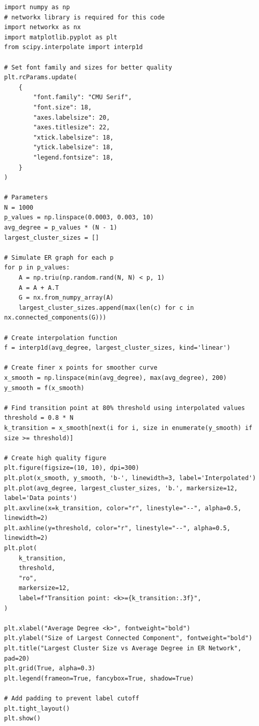 \documentclass{article}
\begin{document}
\begin{lstlisting}[caption=Erdős-Rényi Network Analysis]
import numpy as np
# networkx library is required for this code
import networkx as nx
import matplotlib.pyplot as plt
from scipy.interpolate import interp1d

# Set font family and sizes for better quality
plt.rcParams.update(
    {
        "font.family": "CMU Serif",
        "font.size": 18,
        "axes.labelsize": 20,
        "axes.titlesize": 22,
        "xtick.labelsize": 18,
        "ytick.labelsize": 18,
        "legend.fontsize": 18,
    }
)

# Parameters
N = 1000
p_values = np.linspace(0.0003, 0.003, 10) 
avg_degree = p_values * (N - 1)
largest_cluster_sizes = []

# Simulate ER graph for each p
for p in p_values:
    A = np.triu(np.random.rand(N, N) < p, 1)
    A = A + A.T
    G = nx.from_numpy_array(A)
    largest_cluster_sizes.append(max(len(c) for c in nx.connected_components(G)))

# Create interpolation function
f = interp1d(avg_degree, largest_cluster_sizes, kind='linear')

# Create finer x points for smoother curve
x_smooth = np.linspace(min(avg_degree), max(avg_degree), 200)
y_smooth = f(x_smooth)

# Find transition point at 80% threshold using interpolated values
threshold = 0.8 * N
k_transition = x_smooth[next(i for i, size in enumerate(y_smooth) if size >= threshold)]

# Create high quality figure
plt.figure(figsize=(10, 10), dpi=300)
plt.plot(x_smooth, y_smooth, 'b-', linewidth=3, label='Interpolated')
plt.plot(avg_degree, largest_cluster_sizes, 'b.', markersize=12, label='Data points')
plt.axvline(x=k_transition, color="r", linestyle="--", alpha=0.5, linewidth=2)
plt.axhline(y=threshold, color="r", linestyle="--", alpha=0.5, linewidth=2)
plt.plot(
    k_transition,
    threshold,
    "ro",
    markersize=12,
    label=f"Transition point: <k>={k_transition:.3f}",
)

plt.xlabel("Average Degree <k>", fontweight="bold")
plt.ylabel("Size of Largest Connected Component", fontweight="bold")
plt.title("Largest Cluster Size vs Average Degree in ER Network", pad=20)
plt.grid(True, alpha=0.3)
plt.legend(frameon=True, fancybox=True, shadow=True)

# Add padding to prevent label cutoff
plt.tight_layout()
plt.show()
\end{lstlisting}
\end{document}
